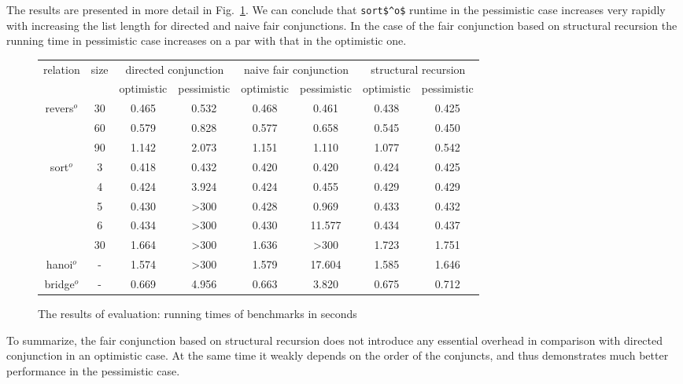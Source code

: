 The results are presented in more detail in Fig.~\ref{fair:evaluation-table}. We can conclude that \lstinline{sort$^o$} runtime in the pessimistic case increases
very rapidly with increasing the list length for directed and naive fair conjunctions. In the case of the fair conjunction based on structural recursion the running time in pessimistic case
increases on a par with that in the optimistic one.

\begin{figure}[]
  \small
  \centering
  \begin{tabular}{ c | c | c | c | c | c | c | c }
    \multirow{2}{*}{relation} & \multirow{2}{*}{size} & 
    \multicolumn{2}{c}{directed conjunction} &
    \multicolumn{2}{c}{naive fair conjunction} &
    \multicolumn{2}{c}{structural recursion} \\
    \cline{3-8}
    & & optimistic & pessimistic & optimistic & pessimistic & optimistic & pessimistic  \\ 
    \hline
    \multirow{3}{*}{revers$^o$}
                 & 30   & 0.465 & 0.532 & 0.468 & 0.461  & 0.438 & 0.425 \\
                 & 60   & 0.579 & 0.828 & 0.577 & 0.658  & 0.545 & 0.450 \\
                 & 90   & 1.142 & 2.073 & 1.151 & 1.110  & 1.077 & 0.542 \\
    \hline
    \multirow{5}{*}{sort$^o$}
                 & 3    & 0.418 & 0.432 & 0.420 & 0.420  & 0.424 & 0.425 \\
                 & 4    & 0.424 & 3.924 & 0.424 & 0.455  & 0.429 & 0.429 \\
                 & 5    & 0.430 & >300  & 0.428 & 0.969  & 0.433 & 0.432 \\
                 & 6    & 0.434 & >300  & 0.430 & 11.577 & 0.434 & 0.437 \\
                 & 30   & 1.664 & >300  & 1.636 & >300   & 1.723 & 1.751 \\ 
    \hline
    hanoi$^o$    & -    & 1.574 & >300  & 1.579 & 17.604 & 1.585 & 1.646 \\
    \hline
    bridge$^o$   & -    & 0.669 & 4.956 & 0.663 & 3.820 & 0.675 & 0.712    

  \end{tabular}
  \caption{The results of evaluation: running times of benchmarks in seconds}
  \label{fair:evaluation-table}
\end{figure}

To summarize, the fair conjunction based on structural recursion does not introduce any essential overhead in comparison with directed conjunction in an optimistic case. At the same time it
weakly depends on the order of the conjuncts, and thus demonstrates much better performance in the pessimistic case.
